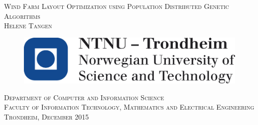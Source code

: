 \begin{titlepage}
 \vspace*{\fill}
    \begin{center}
    {\Huge \scshape \Large Wind Farm Layout Optimization using Population Distributed Genetic Algorithms}\\[0.5cm]
      {      \scshape Helene Tangen }
     \end{center}
	\vspace*{3cm}
    \begin{figure}[h!]
    \centering
    \includegraphics[scale=0.3]{images/ntnu/logo}
    \end{figure}
    \begin{center}
    \scshape Department of Computer and Information Science \\
    \scshape Faculty of Information Technology, Mathematics and Electrical Engineering\\
  	\normalfont Trondheim, December 2015
    \end{center}
   \vspace*{\fill}

\end{titlepage}
